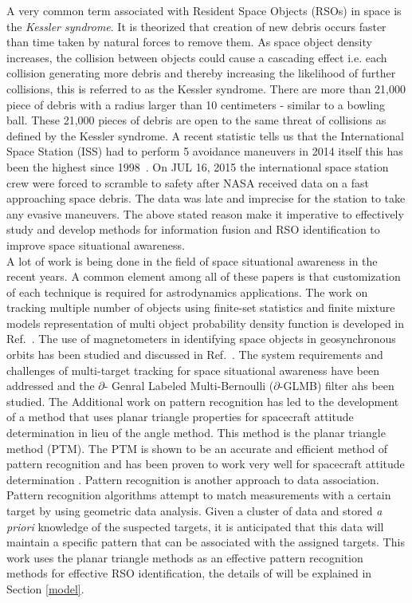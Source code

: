 \documentclass[]{aiaa-tc}%
\begin{document}
 A very common term associated with Resident Space Objects (RSOs) in space is the \textit{Kessler syndrome}. It is theorized that creation of new debris occurs faster than time taken by natural forces to remove them. As space object density  increases, the collision between objects could cause a cascading effect i.e. each collision generating more debris and thereby increasing the likelihood of further collisions, this is referred to as the Kessler syndrome. There are more than 21,000 piece of debris with a radius larger than 10 centimeters  - similar to a bowling ball\cite{nasa_nasa_2015}. These 21,000 pieces of debris are open to the same threat of collisions as defined by the Kessler syndrome. A recent statistic tells us that the International Space Station (ISS) had to perform 5 avoidance maneuvers in 2014 itself this has been the highest since 1998~\cite{nasa_orbital_2015}. On JUL 16, 2015 the international space station crew were forced to scramble to safety after NASA received data on a fast approaching space debris\cite{evasive_2015}. The data was late and imprecise for the station to take any evasive maneuvers. The above stated reason make it imperative to effectively study and develop methods for information fusion and RSO identification to improve space situational awareness.\\

A lot of work is being done in the field of space situational awareness in the recent years. A common element among all of these papers is that customization of
each technique is required for astrodynamics applications. The work on tracking multiple number of objects using finite-set statistics and finite mixture models representation of multi object probability density function is developed in Ref.~. The use of magnetometers in identifying space objects in geosynchronous orbits has been studied and discussed in Ref.~. The system requirements and challenges of multi-target tracking for space situational awareness have been addressed and the $\partial$- Genral Labeled Multi-Bernoulli ($\partial$-GLMB) filter ahs been studied. The Additional work on pattern recognition has led to the development of a method that uses planar triangle properties for spacecraft attitude determination in lieu of the angle method.  This method is the planar triangle method (PTM). The PTM is shown to be an accurate and efficient method of pattern recognition and has been proven to work very well for spacecraft attitude determination \cite{cole_fast_2006}. Pattern recognition is another approach to data association. Pattern recognition algorithms attempt to match measurements with a certain target by using geometric data analysis. Given a cluster of data and stored \textit{a priori} knowledge of the suspected targets, it is anticipated that this data will maintain a specific pattern that can be associated with the assigned targets. This work uses the planar triangle methods as an effective pattern recognition methods for effective RSO identification, the details of will be explained in Section \ref{model}.\\ 
\end{document}
